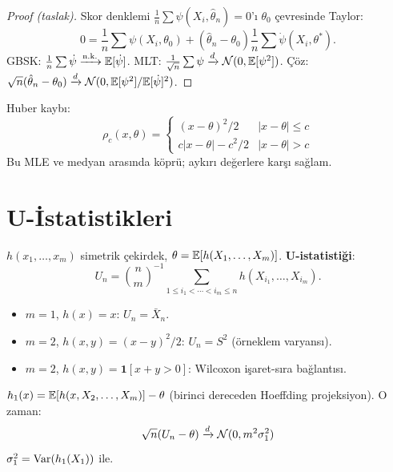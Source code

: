 \begin{proof}[Proof (taslak)]
Skor denklemi $\frac{1}{n}\sum\psi(X_i,\hat\theta_n)=0$'ı $\theta_0$ çevresinde Taylor:
\[
  0 = \frac{1}{n}\sum\psi(X_i,\theta_0) + (\hat\theta_n-\theta_0)\frac{1}{n}\sum\dot\psi(X_i,\theta^*).
\]
GBSK: $\frac{1}{n}\sum\dot\psi\xrightarrow{\text{n.k.}}\mathbb{E}[\dot\psi]$. MLT: $\frac{1}{\sqrt{n}}\sum\psi\xrightarrow{d}\mathcal{N}(0,\mathbb{E}[\psi^2])$. Çöz: $\sqrt{n}(\hat\theta_n-\theta_0)\xrightarrow{d}\mathcal{N}(0,\mathbb{E}[\psi^2]/\mathbb{E}[\dot\psi]^2)$.
\end{proof}

\begin{ornek}\label{ex:huber}
Huber kaybı:
\[
  \rho_c(x,\theta) = \begin{cases}(x-\theta)^2/2 & |x-\theta|\leq c \\ c|x-\theta|-c^2/2 & |x-\theta|>c\end{cases}
\]
Bu MLE ve medyan arasında köprü; aykırı değerlere karşı sağlam.
\end{ornek}

\section{U-İstatistikleri}
\label{sec:u_istatistikleri}

\begin{tanim}[U-istatistiği]\label{def:u_istatistik}
$h(x_1,\ldots,x_m)$ simetrik çekirdek, $\theta = \mathbb{E}[h(X_1,\ldots,X_m)]$. \textbf{U-istatistiği}:
\[
  U_n = \binom{n}{m}^{-1}\sum_{1\leq i_1<\cdots<i_m\leq n}h(X_{i_1},\ldots,X_{i_m}).
\]
\end{tanim}

\begin{ornek}
\begin{itemize}
  \item $m=1$, $h(x)=x$: $U_n=\bar{X}_n$.
  \item $m=2$, $h(x,y)=(x-y)^2/2$: $U_n=S^2$ (örneklem varyansı).
  \item $m=2$, $h(x,y)=\mathbf{1}[x+y>0]$: Wilcoxon işaret-sıra bağlantısı.
\end{itemize}
\end{ornek}

\begin{teorem}\label{thm:hoeffding}
$h_1(x) = \mathbb{E}[h(x,X_2,\ldots,X_m)] - \theta$ (birinci dereceden Hoeffding projeksiyon). O zaman:
\[
  \sqrt{n}(U_n - \theta) \xrightarrow{d} \mathcal{N}(0, m^2\sigma_1^2)
\]
$\sigma_1^2 = \operatorname{Var}(h_1(X_1))$ ile.
\end{teorem}

